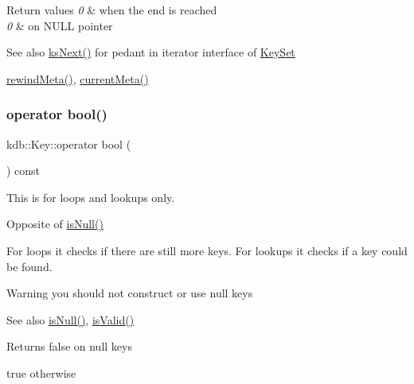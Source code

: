 \begin{DoxyRetVals}{Return values}
{\em 0} & when the end is reached \\
\hline
{\em 0} & on N\+U\+LL pointer\\
\hline
\end{DoxyRetVals}
\begin{DoxySeeAlso}{See also}
\hyperlink{group__keyset_ga317321c9065b5a4b3e33fe1c399bcec9}{ks\+Next()} for pedant in iterator interface of \hyperlink{classkdb_1_1KeySet}{Key\+Set}

\hyperlink{classkdb_1_1Key_a002af206119ceed17b106e2449cedc91}{rewind\+Meta()}, \hyperlink{classkdb_1_1Key_a848292bf5591e5e845f74a487697cb19}{current\+Meta()} 
\end{DoxySeeAlso}
\mbox{\label{classkdb_1_1Key_a15ee99e8447ee526d600e15938e4a1c0}} 
\subsubsection{\texorpdfstring{operator bool()}{operator bool()}}
{\footnotesize\ttfamily kdb\+::\+Key\+::operator bool (\begin{DoxyParamCaption}{ }\end{DoxyParamCaption}) const\hspace{0.3cm}{\ttfamily [inline]}}



This is for loops and lookups only. 

Opposite of \hyperlink{classkdb_1_1Key_ab70b89caae5fe1e9a2e774733576fa4c}{is\+Null()}

For loops it checks if there are still more keys. For lookups it checks if a key could be found.

\begin{DoxyWarning}{Warning}
you should not construct or use null keys
\end{DoxyWarning}
\begin{DoxySeeAlso}{See also}
\hyperlink{classkdb_1_1Key_ab70b89caae5fe1e9a2e774733576fa4c}{is\+Null()}, \hyperlink{classkdb_1_1Key_a69e621790e5717c56f7275e0b8d5e27c}{is\+Valid()} 
\end{DoxySeeAlso}
\begin{DoxyReturn}{Returns}
false on null keys 

true otherwise 
\end{DoxyReturn}
\mbox{\label{classkdb_1_1Key_a7cf40dd6e79e63765c9535a8fcee6491}} 
